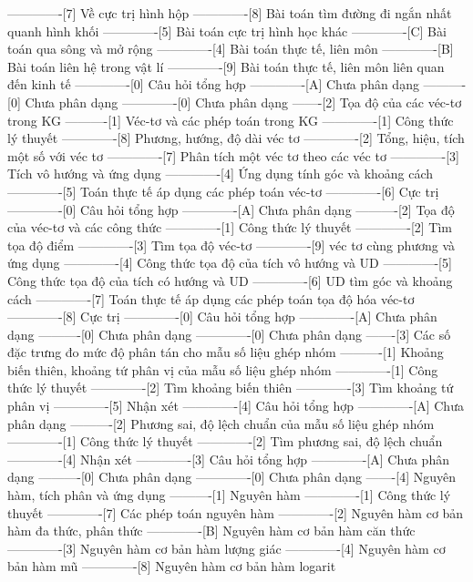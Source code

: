 -------------[7] Về cực trị hình hộp
-------------[8] Bài toán tìm đường đi ngắn nhất quanh hình khối
-------------[5] Bài toán cực trị hình học khác
-------------[C] Bài toán qua sông và mở rộng
-------------[4] Bài toán thực tế, liên môn
-------------[B] Bài toán liên hệ trong vật lí
-------------[9] Bài toán thực tế, liên môn liên quan đến kinh tế
-------------[0] Câu hỏi tổng hợp
-------------[A] Chưa phân dạng
----------[0] Chưa phân dạng
-------------[0] Chưa phân dạng
-------[2] Tọa độ của các véc-tơ trong KG
----------[1] Véc-tơ và các phép toán trong KG
-------------[1] Công thức lý thuyết
-------------[8] Phương, hướng, độ dài véc tơ
-------------[2] Tổng, hiệu, tích một số với véc tơ
-------------[7] Phân tích một véc tơ theo các véc tơ
-------------[3] Tích vô hướng và ứng dụng
-------------[4] Ứng dụng tính góc và khoảng cách
-------------[5] Toán thực tế áp dụng các phép toán véc-tơ
-------------[6] Cực trị 
-------------[0] Câu hỏi tổng hợp
-------------[A] Chưa phân dạng
----------[2] Tọa độ của véc-tơ và các công thức
-------------[1] Công thức lý thuyết
-------------[2] Tìm tọa độ điểm
-------------[3] Tìm tọa độ véc-tơ
-------------[9] véc tơ cùng phương và ứng dụng
-------------[4] Công thức tọa độ của tích vô hướng và UD
-------------[5] Công thức tọa độ của tích có hướng và UD
-------------[6] UD tìm góc và khoảng cách
-------------[7] Toán thực tế áp dụng các phép toán tọa độ hóa véc-tơ
-------------[8] Cực trị
-------------[0] Câu hỏi tổng hợp
-------------[A] Chưa phân dạng
----------[0] Chưa phân dạng
-------------[0] Chưa phân dạng
-------[3] Các số đặc trưng đo mức độ phân tán cho mẫu số liệu ghép nhóm
----------[1] Khoảng biến thiên, khoảng tứ phân vị của mẫu số liệu ghép nhóm
-------------[1] Công thức lý thuyết
-------------[2] Tìm khoảng biến thiên 
-------------[3] Tìm khoảng tứ phân vị
-------------[5] Nhận xét
-------------[4] Câu hỏi tổng hợp
-------------[A] Chưa phân dạng
----------[2] Phương sai, độ lệch chuẩn của mẫu số liệu ghép nhóm
-------------[1] Công thức lý thuyết
-------------[2] Tìm phương sai, độ lệch chuẩn
-------------[4] Nhận xét
-------------[3] Câu hỏi tổng hợp
-------------[A] Chưa phân dạng
----------[0] Chưa phân dạng
-------------[0] Chưa phân dạng
-------[4] Nguyên hàm, tích phân và ứng dụng
----------[1] Nguyên hàm
-------------[1] Công thức lý thuyết
-------------[7] Các phép toán nguyên hàm
-------------[2] Nguyên hàm cơ bản hàm đa thức, phân thức
-------------[B] Nguyên hàm cơ bản hàm căn thức
-------------[3] Nguyên hàm cơ bản hàm lượng giác
-------------[4] Nguyên hàm cơ bản hàm mũ
-------------[8] Nguyên hàm cơ bản hàm logarit
